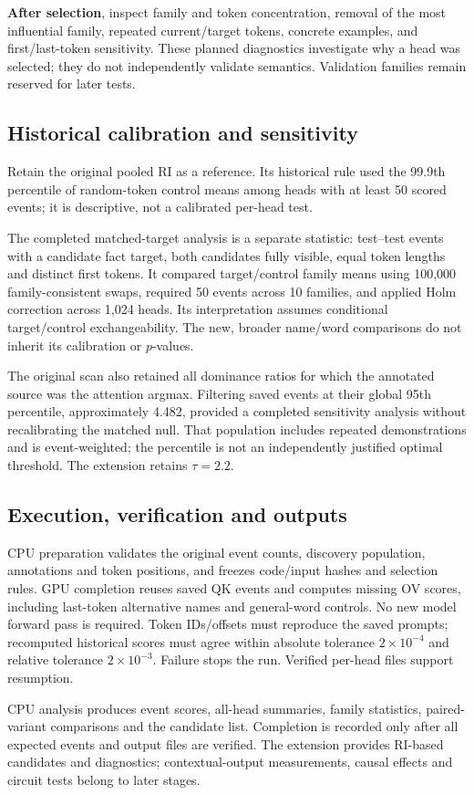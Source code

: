 \textbf{After selection}, inspect family and token concentration, removal of the most influential family, repeated current/target tokens, concrete examples, and first/last-token sensitivity. These planned diagnostics investigate why a head was selected; they do not independently validate semantics. Validation families remain reserved for later tests.

\subsection{Historical calibration and sensitivity}

Retain the original pooled RI as a reference. Its historical rule used the 99.9th percentile of random-token control means among heads with at least 50 scored events; it is descriptive, not a calibrated per-head test.

The completed matched-target analysis is a separate statistic: test--test events with a candidate fact target, both candidates fully visible, equal token lengths and distinct first tokens. It compared target/control family means using 100,000 family-consistent swaps, required 50 events across 10 families, and applied Holm correction across 1,024 heads. Its interpretation assumes conditional target/control exchangeability. The new, broader name/word comparisons do not inherit its calibration or $p$-values.

The original scan also retained all dominance ratios for which the annotated source was the attention argmax. Filtering saved events at their global 95th percentile, approximately 4.482, provided a completed sensitivity analysis without recalibrating the matched null. That population includes repeated demonstrations and is event-weighted; the percentile is not an independently justified optimal threshold. The extension retains $\tau=2.2$.

\subsection{Execution, verification and outputs}

CPU preparation validates the original event counts, discovery population, annotations and token positions, and freezes code/input hashes and selection rules. GPU completion reuses saved QK events and computes missing OV scores, including last-token alternative names and general-word controls. No new model forward pass is required. Token IDs/offsets must reproduce the saved prompts; recomputed historical scores must agree within absolute tolerance $2\times10^{-4}$ and relative tolerance $2\times10^{-3}$. Failure stops the run. Verified per-head files support resumption.

CPU analysis produces event scores, all-head summaries, family statistics, paired-variant comparisons and the candidate list. Completion is recorded only after all expected events and output files are verified. The extension provides RI-based candidates and diagnostics; contextual-output measurements, causal effects and circuit tests belong to later stages.
